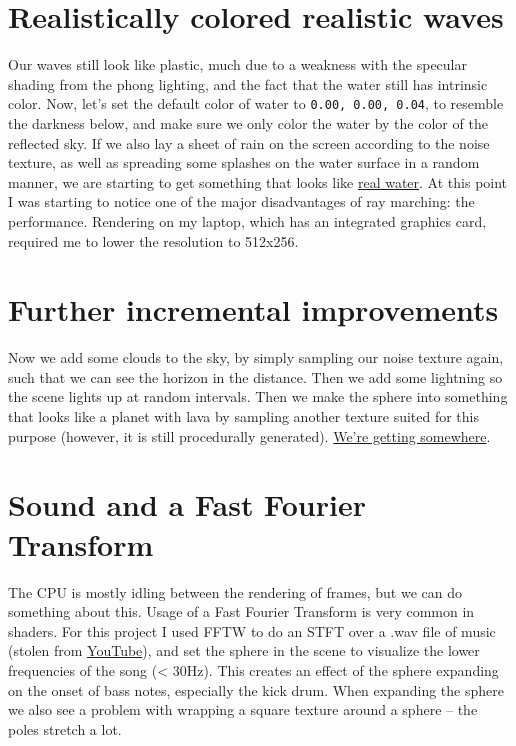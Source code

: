 \documentclass[abstract=off,oneside]{scrreprt}
\begin{document}
\section*{Realistically colored realistic waves}
\label{sec-10}
\label{sec:realisticcolor}
Our waves still look like plastic, much due to a weakness with the
specular shading from the phong lighting, and the fact that the water
still has intrinsic color. Now, let's set the default color of water
to \verb~0.00, 0.00, 0.04~, to resemble the darkness below, and make sure
we only color the water by the color of the reflected sky. If we also
lay a sheet of rain on the screen according to the noise texture, as
well as spreading some splashes on the water surface in a random
manner, we are starting to get something that looks like \hyperref[fig:okwater]{real
water}. At this point I was starting to notice one of the major
disadvantages of ray marching: the performance. Rendering on my
laptop, which has an integrated graphics card, required me to lower
the resolution to 512x256.

\section*{Further incremental improvements}
\label{sec-11}
\label{sec:furtherimprovements}
Now we add some clouds to the sky, by simply sampling our noise
texture again, such that we can see the horizon in the distance. Then
we add some lightning so the scene lights up at random intervals. Then
we make the sphere into something that looks like a planet with lava
by sampling another texture suited for this purpose (however, it is
still procedurally generated). \hyperref[fig:improvements]{We're getting somewhere}.

\section*{Sound and a Fast Fourier Transform}
\label{sec-12}
\label{sec:sound}
The CPU is mostly idling between the rendering of frames, but we can
do something about this. Usage of a Fast Fourier Transform is very
common in shaders. For this project I used FFTW to do an STFT over a
.wav file of music (stolen from \href{https://www.youtube.com/watch?v\%3DWeIIrFhrePE}{YouTube}), and set the sphere in the
scene to visualize the lower frequencies of the song (< 30Hz). This
creates an effect of the sphere expanding on the onset of bass notes,
especially the kick drum. When expanding the sphere we also see a
problem with wrapping a square texture around a sphere -- the poles
stretch a lot.
\end{document}
